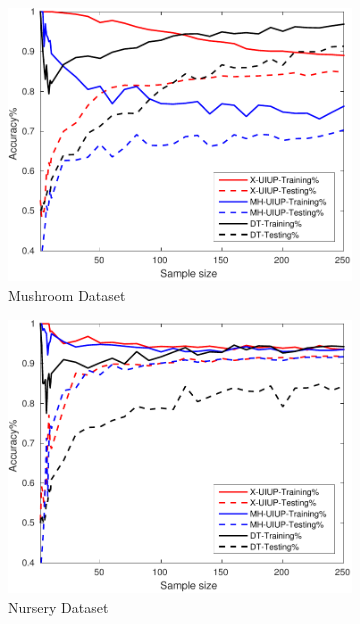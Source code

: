 \begin{figure}[ht]
	\\
  \begin{subfigure}[b]{0.3\textwidth}
		\centering
  	\includegraphics[width=\textwidth]{figs/PLPTF/Trees/MushroomDownsampled_Trees_X_MH.pdf}
  	\caption{Mushroom Dataset}
		\label{fig:Mush1}
	\end{subfigure}
  \begin{subfigure}[b]{0.3\textwidth}
		\centering
  	\includegraphics[width=\textwidth]{figs/PLPTF/Trees/NurseryDownsampledFurther_Trees_X_MH.pdf}
  	\caption{Nursery Dataset}
		\label{fig:N1}
	\end{subfigure}
  \begin{subfigure}[b]{0.3\textwidth}

\end{subfigure}
\end{figure}

